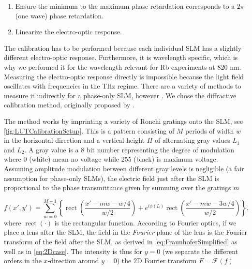 \begin{enumerate}
    \itemsep=0pt
    
    \item Ensure the minimum to the maximum phase retardation corresponds to a $2\pi$ (one wave) phase retardation.
    
    \item Linearize the electro-optic response. 
\end{enumerate}
The calibration has to be performed because each individual SLM has a slightly different electro-optic response. 
Furthermore, it is wavelength specific, which is why we performed it for the wavelength relevant for Rb experiments at 820 nm. 
Measuring the electro-optic response directly is impossible because the light field oscillates with frequencies in the THz regime.
There are a variety of methods to measure it indirectly for a phase-only \ac{SLM}, however \cite{Li2019}.
We chose the diffractive calibration method, originally proposed by \cite{Zhang1994}.

The method works by imprinting a variety of Ronchi gratings onto the SLM, see \cref{fig:LUTCalibrationSetup}.
This is a pattern consisting of $M$ periods of width $w$ in the horizontal direction and a vertical height $H$ of alternating gray values $L_1$ and $L_2$.
A gray value is a 8 bit number representing the degree of modulation where 0 (white) mean no voltage while 255 (black) is maximum voltage. 
Assuming amplitude modulation between different gray levels is negligible (a fair assumption for phase-only SLMs), the electric field just after the SLM is proportional to the phase transmittance given by summing over the gratings $m$ \cite{Zhang1994}

\begin{equation}\label{eq:FieldAfterSLM}
    f(x',y') = \sum_{m=0}^{M-1} \left\{
    \operatorname{rect}\left(\frac{x'-m w - w/4}{w/2}\right) + e^{i \phi(L)} \operatorname{rect}\left(\frac{x'- m w - 3 w/4}{w/2}\right)
    \right\},
\end{equation}
where $\operatorname{rect}(\cdot)$ is the rectangular function. 
According to Fourier optics, if we place a lens after the SLM, the field in the \textit{Fourier} plane of the lens is the Fourier transform of the field after the SLM, as derived in \cref{eq:FraunhoferSimplified} as well as in \cref{eq:2Dcase}.
The intensity is thus for $y=0$ (we separate the different orders in the $x$-direction around $y=0$) the 2D Fourier transform $F = \mathcal{F}(f)$ \cite{Zhang1994}

